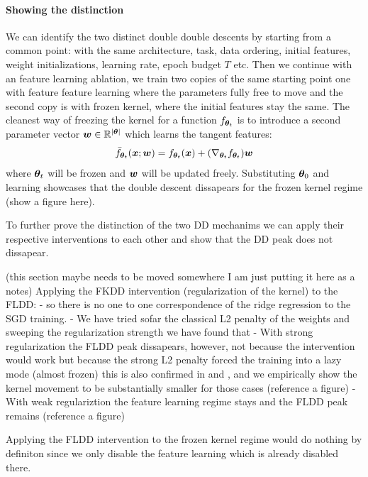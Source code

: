 \documentclass[10pt]{article} %
\begin{document}
\paragraph{Showing the distinction} We can identify the two distinct double double descents by starting from a common point: with the same architecture, task, data ordering, initial features, weight initializations, learning rate, epoch budget $T$ etc. Then we continue with an feature learning ablation, we train two copies of the same starting point one with feature feature learning where the parameters fully free to move and the second copy is with frozen kernel, where the initial features stay the same. The cleanest way of freezing the kernel for a function $f_{{\bm{\theta}}_t}$ is to introduce a second parameter vector ${\bm{w}} \in {\mathbb{R}}^{\lvert {\bm{\theta}} \rvert}$ which learns the tangent features:
\begin{equation} \label{eq:frozen-kernel}
    \bar{f}_{{\bm{\theta}}_t} ({\bm{x}}; {\bm{w}}) = f_{{\bm{\theta}}_t} ({\bm{x}}) +  (\nabla_{{\bm{\theta}}_t} f_{{\bm{\theta}}_t}) {\bm{w}} 
\end{equation}
where ${\bm{\theta}}_t$ will be frozen and ${\bm{w}}$ will be updated freely. Substituting ${\bm{\theta}}_0$ and learning showcases that the double descent dissapears for the frozen kernel regime (show a figure here).

To further prove the distinction of the two DD mechanims we can apply their respective interventions to each other and show that the DD peak does not dissapear.

(this section maybe needs to be moved somewhere I am just putting it here as a notes) 
Applying the FKDD intervention (regularization of the kernel) to the FLDD:
- so there is no one to one correspondence of the ridge regression to the SGD training.
- We have tried sofar the classical L2 penalty of the weights and sweeping the regularization strength we have found that
- With strong regularization the FLDD peak dissapears, however, not because the intervention would work but because the strong L2 penalty forced the training into a lazy mode (almost frozen) this is also confirmed in \citet{repasky2023neuralsteincriticsstaged} and \citet{Lewkowycz2020}, and we empirically show the kernel movement to be substantially smaller for those cases (reference a figure)
- With weak regulariztion the feature learning regime stays and the FLDD peak remains (reference a figure)

Applying the FLDD intervention to the frozen kernel regime would do nothing by definiton since we only disable the feature learning which is already disabled there.
\end{document}
